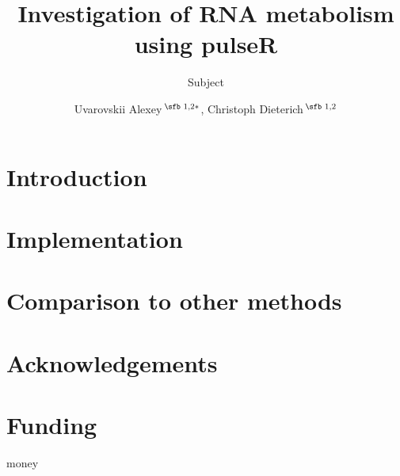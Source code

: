 \documentclass{bioinfo}
\begin{document}

\subtitle{Subject}

\title[pulseR package]{Investigation of RNA metabolism using pulseR}
\author[Uvarovskii \textit{et~al}.]{
Uvarovskii Alexey\,$^{\text{\sfb 1,2}*}$,
Christoph Dieterich\,$^{\text{\sfb 1,2}}$ }
\address{$^{\text{\sf 1}}$
Section of Bioinformatics and Systems Cardiology
Klaus Tschira Institute for Integrative Computational Cardiology
Department of Internal Medicine III
University Hospital Heidelberg,   
Im Neuenheimer Feld 669
69120 Heidelberg,
and 
$^{\text{\sf 2}}$
German Center for Cardiovascular Research (DZHK),
Im Neuenheimer Feld 669
69120 Heidelberg
}




\maketitle

\section{Introduction}


\section{Implementation}

\section{Comparison to other methods}

\section*{Acknowledgements}

\section*{Funding}
money	

%
%

%
%
%
%
%

\end{document}
